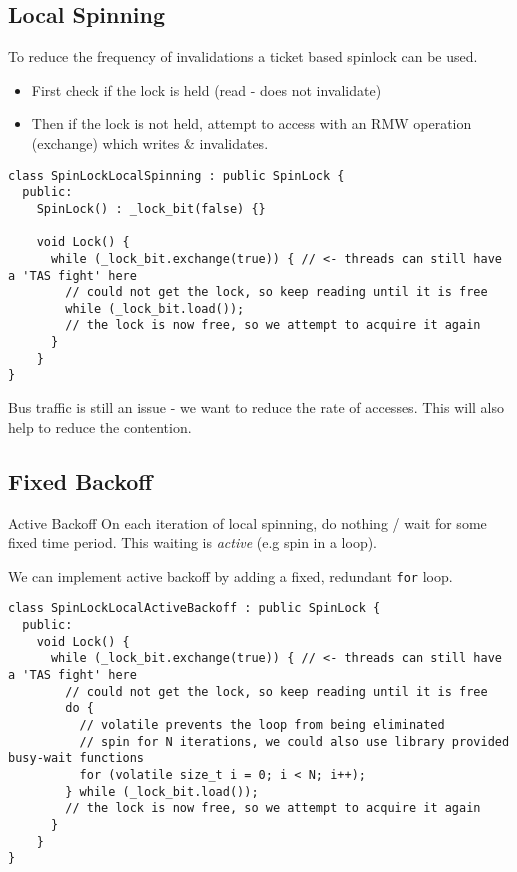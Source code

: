 \subsection{Local Spinning}
To reduce the frequency of invalidations a ticket based spinlock can be used.
\begin{itemize}
  \item First check if the lock is held (read - does not invalidate)
  \item Then if the lock is not held, attempt to access with an RMW operation (exchange) which writes \& invalidates.
\end{itemize}
\begin{verbatim}
class SpinLockLocalSpinning : public SpinLock {
  public:
    SpinLock() : _lock_bit(false) {}

    void Lock() {
      while (_lock_bit.exchange(true)) { // <- threads can still have a 'TAS fight' here
        // could not get the lock, so keep reading until it is free
        while (_lock_bit.load());
        // the lock is now free, so we attempt to acquire it again
      }
    }
}
\end{verbatim}
Bus traffic is still an issue - we want to reduce the rate of accesses. This will also help to reduce the contention.

\subsection{Fixed Backoff}
\begin{definitionbox}{Active Backoff}
  On each iteration of local spinning, do nothing / wait for some fixed time period. This waiting is \textit{active} (e.g spin in a loop).
\end{definitionbox}
We can implement active backoff by adding a fixed, redundant \texttt{for} loop.
\begin{verbatim}
class SpinLockLocalActiveBackoff : public SpinLock {
  public:
    void Lock() {
      while (_lock_bit.exchange(true)) { // <- threads can still have a 'TAS fight' here
        // could not get the lock, so keep reading until it is free
        do {
          // volatile prevents the loop from being eliminated
          // spin for N iterations, we could also use library provided busy-wait functions
          for (volatile size_t i = 0; i < N; i++);
        } while (_lock_bit.load());
        // the lock is now free, so we attempt to acquire it again
      }
    }
}
\end{verbatim}

